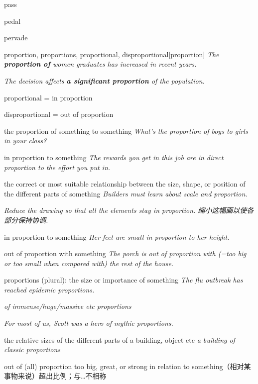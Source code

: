 \begin{DefWord}{pass}
\end{DefWord}

\begin{DefWord}{pedal}
\end{DefWord}

\begin{DefWord}{pervade}
\end{DefWord}

\begin{DefWord}{proportion, proportions, proportional, disproportional}[proportion]
    \textit{The \textbf{proportion of} women graduates has increased in recent years.}

    \textit{The decision affects \textbf{a significant proportion} of the population.}

    proportional = in proportion

    disproportional = out of proportion


the proportion of something to something
\textit{What's the proportion of boys to girls in your class?}

in proportion to something
\textit{The rewards you get in this job are in direct proportion to the effort you put in.}

the correct or most suitable relationship between the size, shape, or position of the different parts of something
\textit{Builders must learn about scale and proportion.}

\textit{Reduce the drawing so that all the elements stay in proportion. 缩小这幅画以使各部分保持协调. }

in proportion to something
\textit{Her feet are small in proportion to her height.}

out of proportion with something
\textit{The porch is out of proportion with (=too big or too small when compared with) the rest of the house.}

proportions (plural):
the size or importance of something
\textit{The flu outbreak has reached epidemic proportions.}

\textit{of immense/huge/massive etc proportions}

\textit{For most of us, Scott was a hero of mythic proportions.}

the relative sizes of the different parts of a building, object etc
\textit{a building of classic proportions}

out of (all) proportion too big, great, or strong in relation to something（相对某事物来说）超出比例；与…不相称


\end{DefWord}
